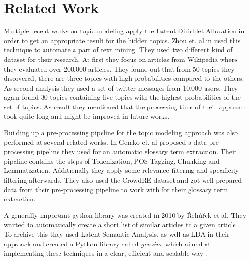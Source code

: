 \section{Related Work} %
\label{sec:related_work}

Multiple recent works on topic modeling apply the Latent Dirichlet Allocation in order to get an appropriate result for the hidden topics. Zhou et. al in \cite{zhou_tong_text_2016} used this technique to automate a part of text mining. They used two different kind of dataset for their research. At first they focus on articles from Wikipedia where they evaluated over 200,000 articles. They found out that from 50 topics they discovered, there are three topics with high probabilities compared to the others. As second analysis they used a set of twitter messages from 10,000 users. They again found 30 topics containing five topics with the highest probabilities of the set of topics. As result they mentioned that the processing time of their approach took quite long and might be improved in future works.


Building up a pre-processing pipeline for the topic modeling approach was also performed at several related works. In \cite{gemkow_automatic_2018}  Gemko et. al proposed a data pre-processing pipeline they used for an automatic glossary term extraction. Their pipeline contains the steps of Tokenization, POS-Tagging, Chunking and Lemmatization. Additionally they apply some relevance filtering and specificity filtering afterwards. They also used the CrowdRE dataset and got well prepared data from their pre-processing pipeline to work with for their glossary term extraction.

A generally important python library was created in 2010 by {\v R}eh{\r u}{\v r}ek et al. They wanted to automatically create a short list of similar articles to a given article \cite{rehurek_software_2010}. To archive this they used Latent Semantic Analysis, as well as LDA in their approach and created a Python library called \emph{gensim}, which aimed at implementing these techniques in a clear, efficient and scalable way \cite{gensim_python}.